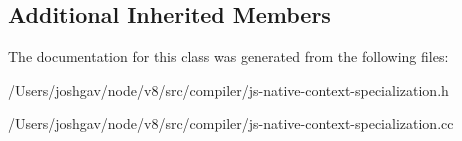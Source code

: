 \subsection*{Additional Inherited Members}


The documentation for this class was generated from the following files\+:\begin{DoxyCompactItemize}
\item 
/\+Users/joshgav/node/v8/src/compiler/js-\/native-\/context-\/specialization.\+h\item 
/\+Users/joshgav/node/v8/src/compiler/js-\/native-\/context-\/specialization.\+cc\end{DoxyCompactItemize}
